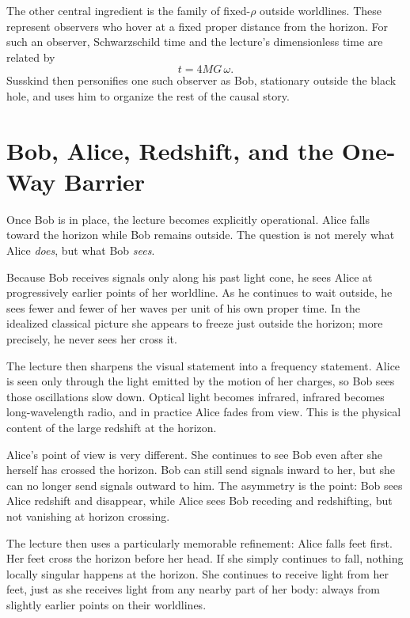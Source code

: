 The other central ingredient is the family of fixed-\(\rho\) outside worldlines. These represent observers who hover at a fixed proper distance from the horizon. For such an observer, Schwarzschild time and the lecture's dimensionless time are related by
\begin{equation}
t = 4MG\,\omega.
\end{equation}
Susskind then personifies one such observer as Bob, stationary outside the black hole, and uses him to organize the rest of the causal story.

\section{Bob, Alice, Redshift, and the One-Way Barrier}

Once Bob is in place, the lecture becomes explicitly operational. Alice falls toward the horizon while Bob remains outside. The question is not merely what Alice \emph{does}, but what Bob \emph{sees}.

Because Bob receives signals only along his past light cone, he sees Alice at progressively earlier points of her worldline. As he continues to wait outside, he sees fewer and fewer of her waves per unit of his own proper time. In the idealized classical picture she appears to freeze just outside the horizon; more precisely, he never sees her cross it.

The lecture then sharpens the visual statement into a frequency statement. Alice is seen only through the light emitted by the motion of her charges, so Bob sees those oscillations slow down. Optical light becomes infrared, infrared becomes long-wavelength radio, and in practice Alice fades from view. This is the physical content of the large redshift at the horizon.

Alice's point of view is very different. She continues to see Bob even after she herself has crossed the horizon. Bob can still send signals inward to her, but she can no longer send signals outward to him. The asymmetry is the point: Bob sees Alice redshift and disappear, while Alice sees Bob receding and redshifting, but not vanishing at horizon crossing.

The lecture then uses a particularly memorable refinement: Alice falls feet first. Her feet cross the horizon before her head. If she simply continues to fall, nothing locally singular happens at the horizon. She continues to receive light from her feet, just as she receives light from any nearby part of her body: always from slightly earlier points on their worldlines.

